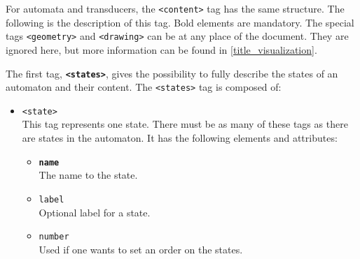 \documentclass[a4paper]{article}
\newcommand{\xtag}[1]{\texttt{<#1>}}
\newcommand{\xattr}[1]{\texttt{#1}}
\begin{document}
For automata and transducers, the \xtag{content} tag has the same
structure.  The following is the description of this tag. Bold
elements are mandatory.  The special tags \xtag{geometry} and
\xtag{drawing} can be at any place of the document. They are ignored
here, but more information can be found in
\autoref{title_visualization}.

\medskip

The first tag, \textbf{\xtag{states}}, gives the possibility to fully
describe the states of an automaton and their content. The
\xtag{states} tag is composed of:
\begin{itemize}
\item \xtag{state}\\
  This tag represents one state. There must be as many of these tags
  as there are states in the automaton. It has the following
  elements and attributes:
  \begin{itemize}
  \item \textbf{\xattr{name}}\\
    The name to the state.
  \item \xattr{label}\\
    Optional label for a state.
  \item \xattr{number}\\
    Used if one wants to set an order on the states.~\\
  \end{itemize}
\end{itemize}
\end{document}
